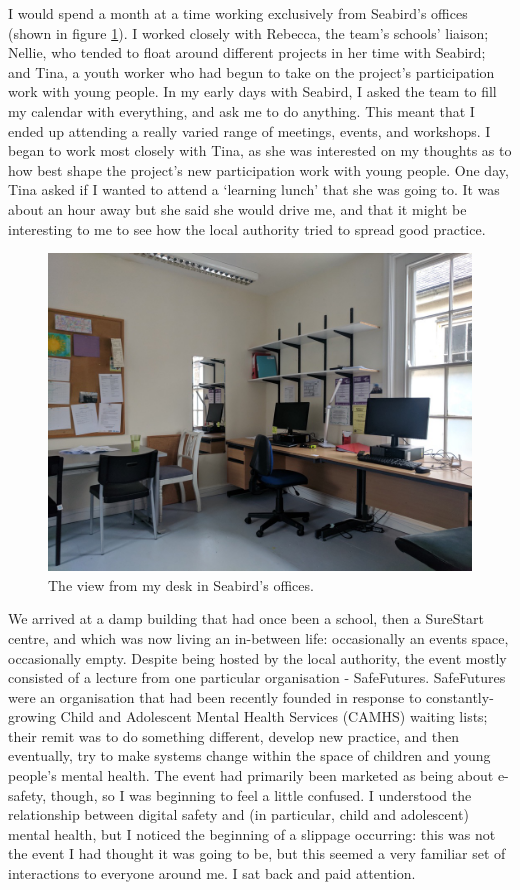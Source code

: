 I would spend a month at a time working exclusively from Seabird's offices (shown in figure \ref{fig:seabird}). I worked closely with Rebecca, the team’s schools’ liaison; Nellie, who tended to float around different projects in her time with Seabird; and Tina, a youth worker who had begun to take on the project’s participation work with young people. In my early days with Seabird, I asked the team to fill my calendar with everything, and ask me to do anything. This meant that I ended up attending a really varied range of meetings, events, and workshops. I began to work most closely with Tina, as she was interested on my thoughts as to how best shape the project’s new participation work with young people. One day, Tina asked if I wanted to attend a `learning lunch’ that she was going to. It was about an hour away but she said she would drive me, and that it might be interesting to me to see how the local authority tried to spread good practice.

\begin{figure}
    \centering
    \includegraphics[width=1\linewidth]{Images/3/seabird.png}
    \caption{The view from my desk in Seabird's offices.}
    \label{fig:seabird}
\end{figure}

We arrived at a damp building that had once been a school, then a SureStart centre, and which was now living an in-between life: occasionally an events space, occasionally empty. Despite being hosted by the local authority, the event mostly consisted of a lecture from one particular organisation - SafeFutures. SafeFutures were an organisation that had been recently founded in response to constantly-growing Child and Adolescent Mental Health Services (CAMHS) waiting lists; their remit was to do something different, develop new practice, and then eventually, try to make systems change within the space of children and young people's mental health. The event had primarily been marketed as being about e-safety, though, so I was beginning to feel a little confused. I understood the relationship between digital safety and (in particular, child and adolescent) mental health, but I noticed the beginning of a slippage occurring: this was not the event I had thought it was going to be, but this seemed a very familiar set of interactions to everyone around me. I sat back and paid attention. 

